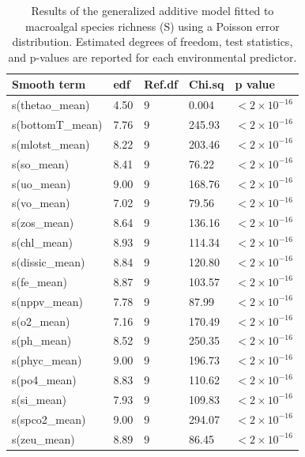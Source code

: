 \documentclass[a4paper,fleqn]{cas-sc}
\begin{document}
\begin{table}[width=\linewidth,cols=5,pos=!htbp]
\caption{Results of the generalized additive model fitted to macroalgal species richness (S) using a Poisson error distribution. Estimated degrees of freedom, test statistics, and p-values are reported for each environmental predictor.}
\small
\begin{tabular*}{\tblwidth}{@{} LLLLL @{}}
\toprule
\textbf{Smooth term} & \textbf{edf} & \textbf{Ref.df} & \textbf{Chi.sq} & \textbf{p value} \\
\midrule
s(thetao\_mean)      & 4.50 & 9 & 0.004  & \textbf{$<2 \times 10^{-16}$} \\
s(bottomT\_mean) & 7.76 & 9 & 245.93 & \textbf{$<2 \times 10^{-16}$} \\
s(mlotst\_mean)   & 8.22 & 9 & 203.46 & \textbf{$<2 \times 10^{-16}$} \\
s(so\_mean)       & 8.41 & 9 & 76.22  & \textbf{$<2 \times 10^{-16}$} \\
s(uo\_mean)       & 9.00 & 9 & 168.76 & \textbf{$<2 \times 10^{-16}$} \\
s(vo\_mean)       & 7.02 & 9 & 79.56  & \textbf{$<2 \times 10^{-16}$} \\
s(zos\_mean)      & 8.64 & 9 & 136.16 & \textbf{$<2 \times 10^{-16}$} \\
s(chl\_mean)      & 8.93 & 9 & 114.34 & \textbf{$<2 \times 10^{-16}$} \\
s(dissic\_mean)   & 8.84 & 9 & 120.80 & \textbf{$<2 \times 10^{-16}$} \\
s(fe\_mean)       & 8.87 & 9 & 103.57 & \textbf{$<2 \times 10^{-16}$} \\
s(nppv\_mean)     & 7.78 & 9 & 87.99  & \textbf{$<2 \times 10^{-16}$} \\
s(o2\_mean)       & 7.16 & 9 & 170.49 & \textbf{$<2 \times 10^{-16}$} \\
s(ph\_mean)       & 8.52 & 9 & 250.35 & \textbf{$<2 \times 10^{-16}$} \\
s(phyc\_mean)     & 9.00 & 9 & 196.73 & \textbf{$<2 \times 10^{-16}$} \\
s(po4\_mean)      & 8.83 & 9 & 110.62 & \textbf{$<2 \times 10^{-16}$} \\
s(si\_mean)       & 7.93 & 9 & 109.83 & \textbf{$<2 \times 10^{-16}$} \\
s(spco2\_mean)    & 9.00 & 9 & 294.07 & \textbf{$<2 \times 10^{-16}$} \\
s(zeu\_mean)      & 8.89 & 9 & 86.45  & \textbf{$<2 \times 10^{-16}$} \\
\bottomrule
\end{tabular*}
\label{tab:10}
\end{table}
\FloatBarrier
\end{document}
